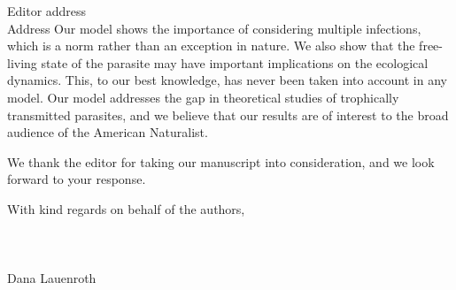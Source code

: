 \documentclass[10,DIN, pagenumber=false, parskip=half,fromalign=right, fromphone=false,fromemail=false, fromurl=false,fromlogo=true, fromrule=false]{scrlttr2}
\begin{document}
\begin{letter}{
\sffamily
\vspace{-0.4cm}
Editor address\\
Address
}
Our model shows the importance of considering multiple infections, which is a norm rather than an exception in nature. 
We also show that the free-living state of the parasite may have important implications on the ecological dynamics.
This, to our best knowledge, has never been taken into account in any model. 
Our model addresses the gap in theoretical studies of trophically transmitted parasites,
and we believe that our results are of interest to the broad audience of the American Naturalist.

We thank the editor for taking our manuscript into consideration, and we look forward to your response.


With kind regards on behalf of the authors,\\
\\
\\
\\
Dana Lauenroth

\end{letter}
\end{document}
